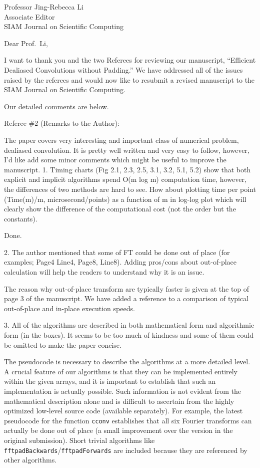 \documentclass[11pt]{letter}
\begin{document}
\def\bq{\par\color{red}}
\def\eq{\color{black}}

\begin{letter}
{Professor Jing-Rebecca Li\\ 
Associate Editor\\
SIAM Journal on Scientific Computing 
}
\opening{Dear Prof.\ Li,}
I want to thank you and the two Referees for reviewing our manuscript,
``Efficient Dealiased Convolutions without Padding.''
We have addressed all of the issues raised by the referees and would now
like to resubmit a revised manuscript to the SIAM Journal on Scientific
Computing.

Our detailed comments are below.

\bq
Referee \#2 (Remarks to the Author): 
 
The paper covers very interesting and important class of numerical problem, dealiased convolution. It is pretty well written and very easy to follow, however, I'd like add some minor comments which might be useful to improve the manuscript. 
1. Timing charts (Fig 2.1, 2.3, 2.5, 3.1, 3.2, 5.1, 5.2) show that both explicit and implicit algorithms spend O(m log m) computation time, however, the differences of two methods are hard to see. How about plotting time per point (Time(m)/m, microsecond/points) as a function of m in log-log plot which will clearly show the difference of the computational cost (not the order but the constants). 
\eq

Done.

\bq
2. The author mentioned that some of FT could be done out of place (for examples; Page4 Line4, Page8, Line8). Adding pros/cons about out-of-place calculation will help the readers to understand why it is an issue. 
\eq

The reason why out-of-place transform are typically faster is given at the
top of page 3 of the manuscript. We have added a reference to a comparison of
typical out-of-place and in-place execution speeds.

\bq
3. All of the algorithms are described in both mathematical form and algorithmic form (in the boxes). It seems to be too much of kindness and some of them could be omitted to make the paper concise. 
\eq

The pseudocode is necessary to describe the algorithms at a more detailed level.
A crucial feature of our algorithms is that they can be implemented
entirely within the given arrays, and it is important to establish that
such an implementation is actually possible. Such information is not
evident from the mathematical description alone and is difficult to ascertain
from the highly optimized low-level source code (available separately). 
For example, the latest pseudocode for the function {\tt cconv} establishes
that all six Fourier transforms can actually be done out of place (a small
improvement over the version in the original submission). Short trivial
algorithms like {\tt fftpadBackwards}/{\tt fftpadForwards} are included
because they are referenced by other algorithms.


\end{letter}
\end{document}
